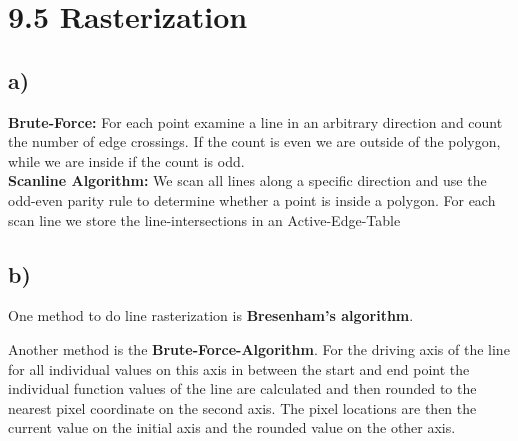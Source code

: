 \documentclass[a4paper]{scrartcl}
\begin{document}
\section*{9.5 Rasterization}
\subsection*{a)}
\textbf{Brute-Force:} For each point examine a line in an arbitrary direction
and count the number of edge crossings. If the count is even we are outside of
the polygon, while we are inside if the count is odd. \\
\textbf{Scanline Algorithm:} We scan all lines along a specific direction and
use the odd-even parity rule to determine whether a point is inside a polygon.
For each scan line we store the line-intersections in an Active-Edge-Table

\subsection*{b)}
One method to do line rasterization is \textbf{Bresenham's algorithm}.

Another method is the \textbf{Brute-Force-Algorithm}.
For the driving axis of the line for all individual values on this axis in between the start and end point the individual function values of the line are calculated
and then rounded to the nearest pixel coordinate on the second axis. The pixel locations are then the current value on the initial axis and the rounded value on the other axis. 
\end{document}
